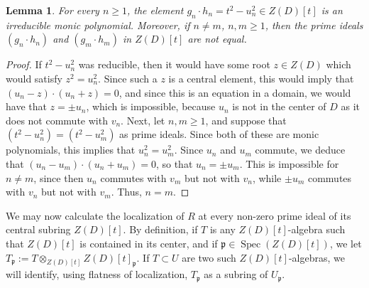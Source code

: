 \documentclass{amsart}
\newtheorem{lem}[equation]{Lemma}
\theoremstyle{definition}
\newcommand{\opn}{\operatorname}
\newcommand{\mfrak}[1]{\mathfrak{#1}}
\newcommand{\p}{\mfrak{p}}
\numberwithin{equation}{section}
\begin{document}
\begin{lem}\label{lem:irrgnhn}
For every $n \ge 1$,
the element $g_n \cdot h_n = t^2 - u_n^2 \in Z(D)[t]$ is an irreducible monic polynomial. Moreover, if $n \ne m$, $n,m \ge 1$,
then the prime ideals $(g_n \cdot h_n)$ and $(g_m \cdot h_m)$ in $Z(D)[t]$ are not equal.
\end{lem}
\begin{proof}
If $t^2-u_n^2$ was reducible,
then it would have some root $z \in Z(D)$ which would satisfy $z^2 = u_n^2$. Since such a $z$ is a central element, this would imply that $(u_n-z)\cdot(u_n + z) = 0$, and since this is an equation in a domain, 
we would have that $z=\pm u_n$, which is impossible, because $u_n$ is not in the center of $D$ as it does not commute with $v_n$.
Next, let $n,m \ge 1$,
and suppose that $(t^2-u_n^2) = (t^2-u_m^2)$ as prime ideals.
Since both of these are monic polynomials, 
this implies that $u_n^2 = u_m^2$.
Since $u_n$ and $u_m$ commute, 
we deduce that $(u_n-u_m)\cdot(u_n+u_m) = 0$, 
so that $u_n = \pm u_m$.
This is impossible for $n\ne m$,
since then $u_n$ commutes with $v_m$ but not with $v_n$,
while $\pm u_m$ commutes with $v_n$ but not with $v_m$.
Thus, $n=m$.
\end{proof}

We may now calculate the localization of $R$ at every non-zero prime ideal of its central subring $Z(D)[t]$.
By definition, if $T$ is any $Z(D)[t]$-algebra such that $Z(D)[t]$ is contained in its center, and if $\p \in \opn{Spec}(Z(D)[t])$,
we let $T_{\p} := T\otimes_{Z(D)[t]} Z(D)[t]_{\p}$.
If $T\subset U$ are two such $Z(D)[t]$-algebras,
we will identify, using flatness of localization, $T_{\p}$ as a subring of $U_{\p}$.
\end{document}
